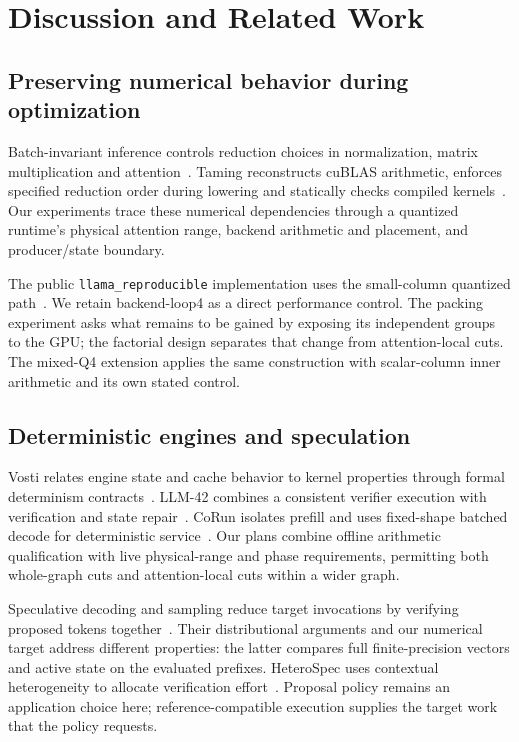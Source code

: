 \section{Discussion and Related Work}
\label{sec:related}
\subsection{Preserving numerical behavior during optimization}
Batch-invariant inference controls reduction choices in normalization, matrix multiplication and attention~\cite{thinkingmachines}. Taming reconstructs cuBLAS arithmetic, enforces specified reduction order during lowering and statically checks compiled kernels~\cite{taming}. Our experiments trace these numerical dependencies through a quantized runtime's physical attention range, backend arithmetic and placement, and producer/state boundary.

The public \texttt{llama\_reproducible} implementation uses the small-column quantized path~\cite{loop4code}. We retain backend-loop4 as a direct performance control. The packing experiment asks what remains to be gained by exposing its independent groups to the GPU; the factorial design separates that change from attention-local cuts. The mixed-Q4 extension applies the same construction with scalar-column inner arithmetic and its own stated control.

\subsection{Deterministic engines and speculation}
Vosti relates engine state and cache behavior to kernel properties through formal determinism contracts~\cite{vosti}. LLM-42 combines a consistent verifier execution with verification and state repair~\cite{llm42}. CoRun isolates prefill and uses fixed-shape batched decode for deterministic service~\cite{corun}. Our plans combine offline arithmetic qualification with live physical-range and phase requirements, permitting both whole-graph cuts and attention-local cuts within a wider graph.

Speculative decoding and sampling reduce target invocations by verifying proposed tokens together~\cite{leviathan2023,chen2023}. Their distributional arguments and our numerical target address different properties: the latter compares full finite-precision vectors and active state on the evaluated prefixes. HeteroSpec uses contextual heterogeneity to allocate verification effort~\cite{liu2026heterospec}. Proposal policy remains an application choice here; reference-compatible execution supplies the target work that the policy requests.

